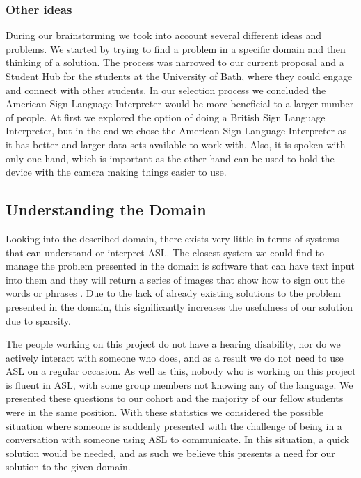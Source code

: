 \documentclass[10pt]{article}
\begin{document}
\subsubsection{Other ideas}

During our brainstorming we took into account several different ideas and problems. We started by 
trying to find a problem in a specific domain and then thinking of a solution. The process was 
narrowed to our current proposal and a Student Hub for the students at the University of Bath, where 
they could engage and connect with other students. In our selection process we concluded the 
American Sign Language Interpreter would be more beneficial to a larger number of 
people. At first we explored the option of doing a British Sign Language Interpreter, but in the end we 
chose the American Sign Language Interpreter as it has better and larger data sets available to 
work with. Also, it is spoken with only one hand, which is important as the other hand can be used to 
hold the device with the camera making things easier to use. 

\subsection{Understanding the Domain}

Looking into the described domain, there exists very little in terms of systems that can understand 
or interpret ASL. The closest system we could find to manage the problem presented in the domain is 
software that can have text input into them and they will return a series of images that show how to 
sign out the words or phrases \cite{handtalk}. Due to the lack of already existing solutions to the 
problem presented in the domain, this significantly increases the usefulness of our solution due to 
sparsity.

The people working on this project do not have a hearing disability, nor do we actively interact 
with someone who does, and as a result we do not need to use ASL on a regular occasion. As well as 
this, nobody who is working on this project is fluent in ASL, with some group members not knowing 
any of the language. We presented these questions to our cohort and the majority of our fellow 
students were in the same position. With these statistics we considered the possible situation 
where someone is suddenly presented with the challenge of being in a conversation with someone using ASL
to communicate. In this situation, a quick solution would be needed, and as such we believe this presents 
a need for our solution to the given domain.
\end{document}
